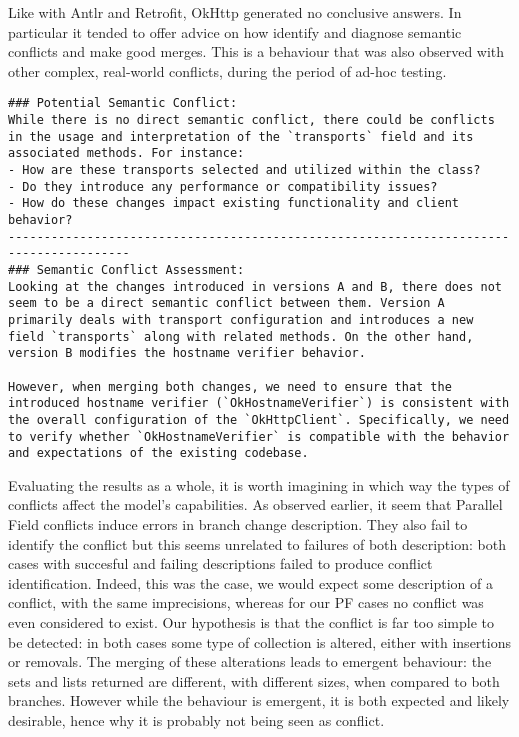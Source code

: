 Like with Antlr and Retrofit, OkHttp generated no conclusive answers. In particular it tended to offer advice on how identify and diagnose semantic conflicts and make good merges. This is a behaviour that was also observed with other complex, real-world conflicts, during the period of ad-hoc testing.
\begin{lstlisting}
### Potential Semantic Conflict:
While there is no direct semantic conflict, there could be conflicts in the usage and interpretation of the `transports` field and its associated methods. For instance:
- How are these transports selected and utilized within the class?
- Do they introduce any performance or compatibility issues?
- How do these changes impact existing functionality and client behavior?
---------------------------------------------------------------------------------------
### Semantic Conflict Assessment:
Looking at the changes introduced in versions A and B, there does not seem to be a direct semantic conflict between them. Version A primarily deals with transport configuration and introduces a new field `transports` along with related methods. On the other hand, version B modifies the hostname verifier behavior.

However, when merging both changes, we need to ensure that the introduced hostname verifier (`OkHostnameVerifier`) is consistent with the overall configuration of the `OkHttpClient`. Specifically, we need to verify whether `OkHostnameVerifier` is compatible with the behavior and expectations of the existing codebase.
\end{lstlisting}

Evaluating the results as a whole, it is worth imagining in which way the types of conflicts affect the model's capabilities. 
As observed earlier, it seem that Parallel Field conflicts induce errors in branch change description. They also fail to identify the conflict but this seems unrelated to failures of both description:
both cases with succesful and failing descriptions failed to produce conflict identification. Indeed, this was the case, we would expect some description of a conflict, with the same imprecisions, whereas
for our PF cases no conflict was even considered to exist. Our hypothesis is that the conflict is far too simple to be detected: in both cases some type of collection is altered, either with insertions or removals.
The merging of these alterations leads to emergent behaviour: the sets and lists returned are different, with different sizes, when compared to both branches.
However while the behaviour is emergent, it is both expected and likely desirable, hence why it is probably not being seen as conflict.

